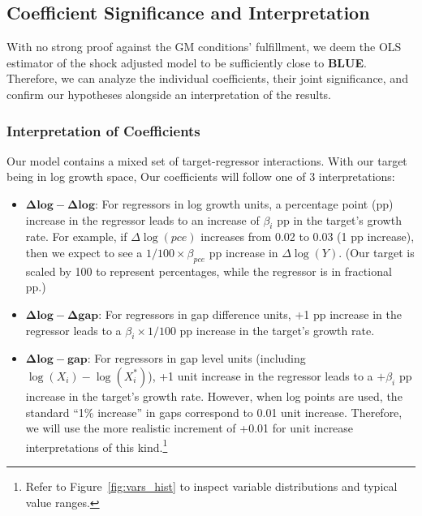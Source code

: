 \subsection{Coefficient Significance and Interpretation}\label{subsubsec:coef_sig_int}
With no strong proof against the GM conditions' fulfillment, we deem the OLS estimator of the shock adjusted model to be sufficiently close to \textbf{BLUE}.
Therefore, we can analyze the individual coefficients, their joint significance, and confirm our hypotheses alongside an interpretation of the results.

\subsubsection{Interpretation of Coefficients}\label{subsubsec:coef_interpretation}
Our model contains a mixed set of target-regressor interactions. With our target being in log growth space,
Our coefficients will follow one of 3 interpretations: 
\begin{itemize}
    \item $\mathbf{\Delta log - \Delta log}$: For regressors in log growth units, a percentage point (pp) increase in the regressor leads to an increase of $\beta_i$ pp in the target's growth rate.
    For example, if $\Delta \log(pce)$ increases from 0.02 to 0.03 (1 pp increase), then we expect to see a $1/100 \times \beta_{pce}$ pp increase in $\Delta \log(Y)$. (Our target is scaled by 100 to represent percentages, while the regressor is in fractional pp.)
    \item $\mathbf{\Delta log - \Delta gap}$: For regressors in gap difference units, +1 pp increase in the regressor leads to a $\beta_i \times 1/100$ pp increase in the target's growth rate.
    \item $\mathbf{\Delta log - gap}$: For regressors in gap level units (including $\log(X_i) - \log(X^*_i)$), +1 unit increase in the regressor leads to a $+\beta_i$ pp increase in the target's growth rate. However, when log points are used, the standard \enquote{1\% increase} in gaps correspond to 0.01 unit increase.
    Therefore, we will use the more realistic increment of +0.01 for unit increase interpretations of this kind.\footnote{Refer to Figure~\ref{fig:vars_hist} to inspect variable distributions and typical value ranges.}
\end{itemize}

